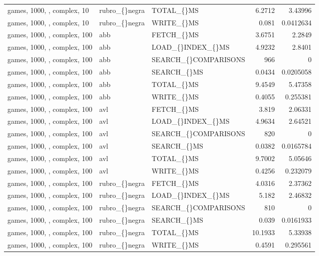 \begin{longtable}{p{4cm}p{1.4cm}p{2.6cm}rr}
games, 1000, , complex, 10 & rubro\_\allowbreak\{\}negra & TOTAL\_\allowbreak\{\}MS & 6.2712 & 3.43996\\
games, 1000, , complex, 10 & rubro\_\allowbreak\{\}negra & WRITE\_\allowbreak\{\}MS & 0.081 & 0.0412634\\
games, 1000, , complex, 100 & abb & FETCH\_\allowbreak\{\}MS & 3.6751 & 2.2849\\
games, 1000, , complex, 100 & abb & LOAD\_\allowbreak\{\}INDEX\_\allowbreak\{\}MS & 4.9232 & 2.8401\\
games, 1000, , complex, 100 & abb & SEARCH\_\allowbreak\{\}COMPARISONS & 966 & 0\\
games, 1000, , complex, 100 & abb & SEARCH\_\allowbreak\{\}MS & 0.0434 & 0.0205058\\
games, 1000, , complex, 100 & abb & TOTAL\_\allowbreak\{\}MS & 9.4549 & 5.47358\\
games, 1000, , complex, 100 & abb & WRITE\_\allowbreak\{\}MS & 0.4055 & 0.255381\\
games, 1000, , complex, 100 & avl & FETCH\_\allowbreak\{\}MS & 3.819 & 2.06331\\
games, 1000, , complex, 100 & avl & LOAD\_\allowbreak\{\}INDEX\_\allowbreak\{\}MS & 4.9634 & 2.64521\\
games, 1000, , complex, 100 & avl & SEARCH\_\allowbreak\{\}COMPARISONS & 820 & 0\\
games, 1000, , complex, 100 & avl & SEARCH\_\allowbreak\{\}MS & 0.0382 & 0.0165784\\
games, 1000, , complex, 100 & avl & TOTAL\_\allowbreak\{\}MS & 9.7002 & 5.05646\\
games, 1000, , complex, 100 & avl & WRITE\_\allowbreak\{\}MS & 0.4256 & 0.232079\\
games, 1000, , complex, 100 & rubro\_\allowbreak\{\}negra & FETCH\_\allowbreak\{\}MS & 4.0316 & 2.37362\\
games, 1000, , complex, 100 & rubro\_\allowbreak\{\}negra & LOAD\_\allowbreak\{\}INDEX\_\allowbreak\{\}MS & 5.182 & 2.46832\\
games, 1000, , complex, 100 & rubro\_\allowbreak\{\}negra & SEARCH\_\allowbreak\{\}COMPARISONS & 810 & 0\\
games, 1000, , complex, 100 & rubro\_\allowbreak\{\}negra & SEARCH\_\allowbreak\{\}MS & 0.039 & 0.0161933\\
games, 1000, , complex, 100 & rubro\_\allowbreak\{\}negra & TOTAL\_\allowbreak\{\}MS & 10.1933 & 5.33938\\
games, 1000, , complex, 100 & rubro\_\allowbreak\{\}negra & WRITE\_\allowbreak\{\}MS & 0.4591 & 0.295561\\

\end{longtable}
